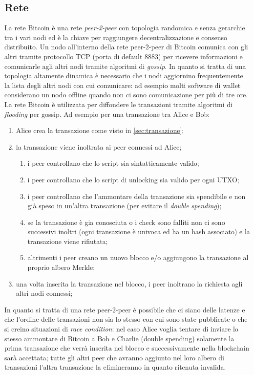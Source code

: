 \begin{enumerate}[1.]
\subsection{Rete}
La rete Bitcoin è una rete \textit{peer-2-peer} con topologia randomica e senza gerarchie tra i vari nodi ed è la chiave per raggiungere decentralizzazione e consenso distribuito.\newline
Un nodo all'interno della rete peer-2-peer di Bitcoin comunica con gli altri tramite protocollo TCP (porta di default $8883$) per ricevere informazioni e comunicarle agli altri nodi tramite algoritmi di \textit{gossip}. In quanto si tratta di una topologia altamente dinamica è necessario che i nodi aggiornino frequentemente la lista degli altri nodi con cui comunicare: ad esempio molti software di wallet considerano un nodo offline quando non ci sono comunicazione per più di tre ore.\newline
La rete Bitcoin è utilizzata per diffondere le transazioni tramite algoritmi di \textit{flooding} per gossip. Ad esempio per una transazione tra Alice e Bob:
\begin{enumerate}
    \item Alice crea la transazione come visto in \ref{sec:transazione};
    \item la transazione viene inoltrata ai peer connessi ad Alice;
        \begin{enumerate}
            \item i peer controllano che lo script sia sintatticamente valido;
            \item i peer controllano che lo script di unlocking sia valido per ogni UTXO;
            \item i peer controllano che l'ammontare della transazione sia spendibile e non già speso in un'altra transazione (per evitare il \textit{double spending});
            \item se la transazione è gia conosciuta o i check sono falliti non ci sono successivi inoltri (ogni transazione è univoca ed ha un hash associato) e la transazione viene rifiutata;
            \item altrimenti i peer creano un nuovo blocco e/o aggiungono la transazione al proprio albero Merkle;
        \end{enumerate}
    \item una volta inserita la transazione nel blocco, i peer inoltrano la richiesta agli altri nodi connessi;
\end{enumerate}
In quanto si tratta di una rete peer-2-peer è possibile che ci siano delle latenze e che l'ordine delle transazioni non sia lo stesso con cui sono state pubblicate o che si creino situazioni di \textit{race condition}: nel caso Alice voglia tentare di inviare lo stesso ammontare di Bitcoin a Bob e Charlie (double spending) solamente la prima transazione che verrà inserita nel blocco e successivamente nella blockchain sarà accettata; tutte gli altri peer che avranno aggiunto nel loro albero di transazioni l'altra transazione la elimineranno in quanto ritenuta invalida.\newline

\end{enumerate}
